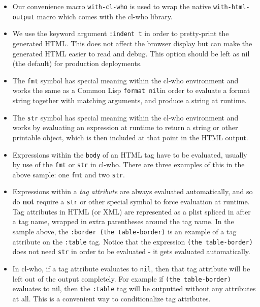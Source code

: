 \documentclass [11pt]{book}
\begin{document}
\begin{itemize}

\item Our convenience macro \texttt{with-cl-who} is used to wrap the native \texttt{with-html-output} macro which comes with the cl-who library.

\item We use the keyword argument \texttt{:indent t} in order to pretty-print the generated HTML. This does
     not affect the browser display but can make the generated HTML
     easier to read and debug. This option should be left as nil (the
     default) for production deployments.

\item The \texttt{fmt} symbol has special meaning
      within the cl-who environment and works the same as a Common
      Lisp \texttt{format nil}in order to evaluate a format
      string together with matching arguments, and produce a string at
      runtime.

\item The \texttt{str} symbol has special meaning
      within the cl-who environment and works by evaluating an
      expression at runtime to return a string or other printable
      object, which is then included at that point in the HTML output.

\item Expressions within the \texttt{body} of an
      HTML tag have to be evaluated, usually by use of the \texttt{fmt} or \texttt{str} in cl-who.  There are three examples of this in the
      above sample: one \texttt{fmt} and two \texttt{str}.

\item Expressions within a \emph{tag attribute} are always evaluated automatically, and so do 
\textbf{not} require a \texttt{str} or other special symbol to force evaluation at
      runtime. Tag attributes in HTML (or XML) are represented as a
      plist spliced in after a tag name, wrapped in extra parentheses
      around the tag name. In the sample above, the \texttt{:border (the table-border)} is an example of a tag attribute on the \texttt{:table} tag. Notice that the expression \texttt{(the table-border)} does not need \texttt{str} in order to be evaluated - it gets evaluated automatically.

\item In cl-who, if a tag attribute evaluates to \texttt{nil}, then that tag attribute will be left out of the output
      completely. For example if \texttt{(the table-border)} evaluates to nil, then the \texttt{:table} tag will be outputted without any attributes at
      all. This is a convenient way to conditionalize tag
      attributes.


\end{itemize}
\end{document}
